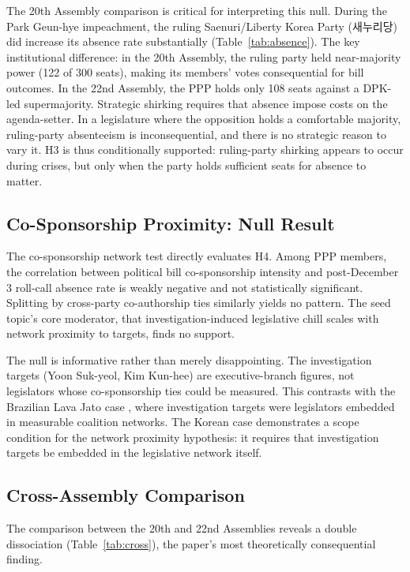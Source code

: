 \documentclass[11pt]{article}
\begin{document}
The 20th Assembly comparison is critical for interpreting this null. During the Park Geun-hye impeachment, the ruling Saenuri/Liberty Korea Party (새누리당) did increase its absence rate substantially (Table~\ref{tab:absence}). The key institutional difference: in the 20th Assembly, the ruling party held near-majority power (122 of 300 seats), making its members' votes consequential for bill outcomes. In the 22nd Assembly, the PPP holds only 108 seats against a DPK-led supermajority. Strategic shirking requires that absence impose costs on the agenda-setter. In a legislature where the opposition holds a comfortable majority, ruling-party absenteeism is inconsequential, and there is no strategic reason to vary it. H3 is thus conditionally supported: ruling-party shirking appears to occur during crises, but only when the party holds sufficient seats for absence to matter.

\subsection{Co-Sponsorship Proximity: Null Result}

The co-sponsorship network test directly evaluates H4. Among PPP members, the correlation between political bill co-sponsorship intensity and post-December 3 roll-call absence rate is weakly negative and not statistically significant. Splitting by cross-party co-authorship ties similarly yields no pattern. The seed topic's core moderator, that investigation-induced legislative chill scales with network proximity to targets, finds no support.

The null is informative rather than merely disappointing. The investigation targets (Yoon Suk-yeol, Kim Kun-hee) are executive-branch figures, not legislators whose co-sponsorship ties could be measured. This contrasts with the Brazilian Lava Jato case \citep{katz2018}, where investigation targets were legislators embedded in measurable coalition networks. The Korean case demonstrates a scope condition for the network proximity hypothesis: it requires that investigation targets be embedded in the legislative network itself.

\subsection{Cross-Assembly Comparison}

The comparison between the 20th and 22nd Assemblies reveals a double dissociation (Table~\ref{tab:cross}), the paper's most theoretically consequential finding.
\end{document}
